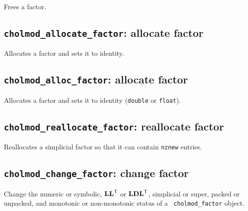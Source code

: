 \documentclass[11pt]{article}
\newcommand{\m}[1]{{\bf{#1}}}       %
\newcommand{\tr}{^{\sf T}}          %
\begin{document}

Frees a factor.

\subsection{{\tt cholmod\_allocate\_factor}: allocate factor}


Allocates a factor and sets it to identity.

\subsection{{\tt cholmod\_alloc\_factor}: allocate factor}


Allocates a factor and sets it to identity
({\tt double} or {\tt float}).

\subsection{{\tt cholmod\_reallocate\_factor}: reallocate factor}


Reallocates a simplicial factor so that it can contain {\tt nznew} entries.

\subsection{{\tt cholmod\_change\_factor}: change factor}


Change the numeric or symbolic, $\m{LL}\tr$ or $\m{LDL}\tr$, simplicial or
super, packed or unpacked, and monotonic or non-monotonic status of a {\tt
cholmod\_factor} object.
\end{document}
